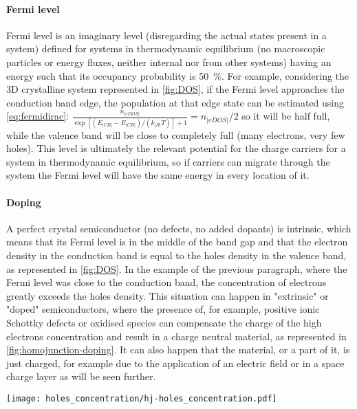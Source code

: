 		\paragraph{Fermi level}
		Fermi level is an imaginary level (disregarding the actual states present in a system) defined for systems in thermodynamic equilibrium (no macroscopic particles or energy fluxes, neither internal nor from other systems) having an energy such that its occupancy probability is \SI{50}{\%}.
		For example, considering the 3D crystalline system represented in \cref{fig:DOS}, if the Fermi level approaches the conduction band edge, the population at that edge state can be estimated using \cref{eq:fermidirac}: $\frac{n_|eDOS|}{\exp[(E_|CB|-E_|CB|)/(k_|B|T)]+1} = n_|eDOS|/2$ so it will be half full, while the valence band will be close to completely full (many electrons, very few holes).
		This level is ultimately the relevant potential for the charge carriers for a system in thermodynamic equilibrium, so if carriers can migrate through the system the Fermi level will have the same energy in every location of it.
		
		\paragraph{Doping}
		A perfect crystal semiconductor (no defects, no added dopants) is intrinsic, which means that its Fermi level is in the middle of the band gap and that the electron density in the conduction band is equal to the holes density in the valence band, as represented in \cref{fig:DOS}.
		In the example of the previous paragraph, where the Fermi level was close to the conduction band, the concentration of electrons greatly exceeds the holes density.
		This situation can happen in "extrinsic" or "doped" semiconductors, where the presence of, for example, positive ionic Schottky defects or oxidised species can compensate the charge of the high electrons concentration and result in a charge neutral material, as represented in \cref{fig:homojunction-doping}.
		It can also happen that the material, or a part of it, is just charged, for example due to the application of an electric field or in a space charge layer as will be seen further.
		
		\begin{SCfigure}
			\centering
			\texttt{[image: holes\_concentration/hj-holes\_concentration.pdf]}
			\label{fig:holes_concentration}
		\end{SCfigure}
	
